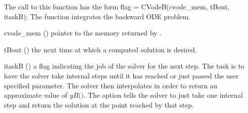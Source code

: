 The call to this function has the form
{
  flag = CVodeB(cvode\_mem, tBout, itaskB);
}
{
  The function  integrates the backward ODE problem.
}
{
  \begin{args}
  \item[cvode\_mem] ()
    pointer to the {\cvodes} memory returned by .
  \item[tBout] ()
    the next time at which a computed solution is desired.
  \item[itaskB] ()
    a flag indicating the job of the solver for the next step. 
    The  task is to have the solver take internal steps until   
    it has reached or just passed the user specified 
    parameter. The solver then interpolates in order to   
    return an approximate value of $yB($$)$. 
    The  option tells the solver to just take one internal step  
    and return the solution at the point reached by that step. 
  \end{args}
}
